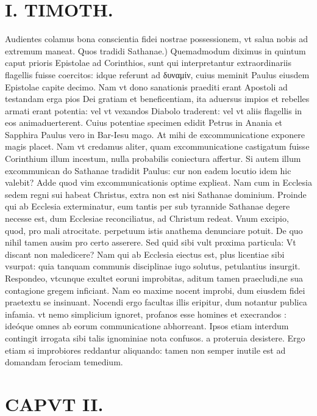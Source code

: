 \documentclass{article}
\begin{document}
\begin{pages}
\section*{I. TIMOTH. }
\marginpar{[ p.16 ]}\pstart Audientes colamus bona conscientia fidei nostrae possessionem, vt salua nobis ad extremum maneat.  \pend\pstart Quos tradidi Sathanae.) Quemadmodum diximus in quintum caput prioris Epistolae ad Corinthios, sunt qui interpretantur extraordinariis flagellis fuisse coercitos: idque referunt ad δυναμίν, cuius meminit Paulus eiusdem Epistolae capite decimo. Nam vt dono sanationis praediti erant Apostoli ad testandam erga pios Dei gratiam et beneficentiam, ita aduersus impios et rebelles armati erant potentia: vel vt vexandos Diabolo traderent: vel vt aliis flagellis in eos animaduerterent. Cuius potentiae specimen edidit Petrus in Anania et Sapphira Paulus vero in Bar-Iesu mago. At mihi de excommunicatione exponere magis placet. Nam vt credamus aliter, quam excommunicatione castigatum fuisse Corinthium illum incestum, nulla probabilis coniectura affertur. Si autem illum excommunican do Sathanae tradidit Paulus: cur non eadem locutio idem hic valebit? Adde quod vim excommunicationis optime explieat. Nam cum in Ecclesia sedem regni sui habeat Christus, extra non est nisi Sathanae dominium. Proinde qui ab Ecclesia exterminatur, eum tantis per sub tyrannide Sathanae degere necesse est, dum Ecclesiae reconciliatus, ad Christum redeat. Vnum excipio, quod, pro mali atrocitate. perpetuum istis anathema denunciare potuit. De quo nihil tamen ausim pro certo asserere. Sed quid sibi vult proxima particula: Vt discant non maledicere? Nam qui ab Ecclesia eiectus est, plus licentiae sibi vsurpat: quia tanquam communis disciplinae iugo solutus, petulantius insurgit. Respondeo, vtcunque exultet eoruni improbitas, aditum tamen praecludi,ne sua contagione gregem inficiant. Nam eo maxime nocent improbi, dum eiusdem fidei praetextu se insinuant. Nocendi ergo facultas illis eripitur, dum notantur publica infamia. vt nemo simplicium ignoret, profanos esse homines et execrandos : ideóque omnes ab eorum communicatione abhorreant. Ipsos etiam interdum contingit irrogata sibi talis ignominiae nota confusos. a proteruia desistere. Ergo etiam si improbiores reddantur aliquando: tamen non semper inutile est ad domandam ferociam temedium.  \pend
\endnumbering\beginnumbering\section{CAPVT II.}
{}

\end{pages}
\end{document}
